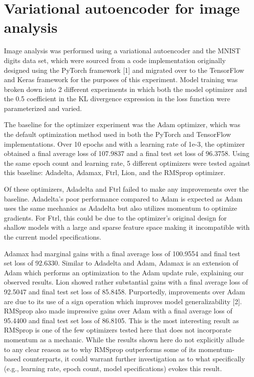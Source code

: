 \documentclass[sigplan]{acmart}
\begin{document}
\section{Variational autoencoder for image analysis}

Image analysis was performed using a variational autoencoder and the MNIST digits data set, which were sourced from a code implementation originally designed using the PyTorch framework [1] and migrated over to the TensorFlow and Keras framework for the purposes of this experiment. Model training was broken down into 2 different experiments in which both the model optimizer and the 0.5 coefficient in the KL divergence expression in the loss function were parameterized and varied.

The baseline for the optimizer experiment was the Adam optimizer, which was the default optimization method used in both the PyTorch and TensorFlow implementations. Over 10 epochs and with a learning rate of 1e-3, the optimizer obtained a final average loss of 107.9837 and a final test set loss of 96.3758. Using the same epoch count and learning rate, 5 different optimizers were tested against this baseline: Adadelta, Adamax, Ftrl, Lion, and the RMSprop optimizer.

Of these optimizers, Adadelta and Ftrl failed to make any improvements over the baseline. Adadelta's poor performance compared to Adam is expected as Adam uses the same mechanics as Adadelta but also utilizes momentum to optimize gradients. For Ftrl, this could be due to the optimizer's original design for shallow models with a large and sparse feature space making it incompatible with the current model specifications.

Adamax had marginal gains with a final average loss of 100.9554 and final test set loss of 92.6330. Similar to Adadelta and Adam, Adamax is an extension of Adam which performs an optimization to the Adam update rule, explaining our observed results. Lion showed rather substantial gains with a final average loss of 92.5047 and final test set loss of 85.8458. Purportedly, improvements over Adam are due to its use of a sign operation which improves model generalizability [2]. RMSprop also made impressive gains over Adam with a final average loss of 95.4400 and final test set loss of 86.8105. This is the most interesting result as RMSprop is one of the few optimizers tested here that does not incorporate momentum as a mechanic. While the results shown here do not explicitly allude to any clear reason as to why RMSprop outperforms some of its momentum-based counterparts, it could warrant further investigation as to what specifically (e.g., learning rate, epoch count, model specifications) evokes this result.
\end{document}
